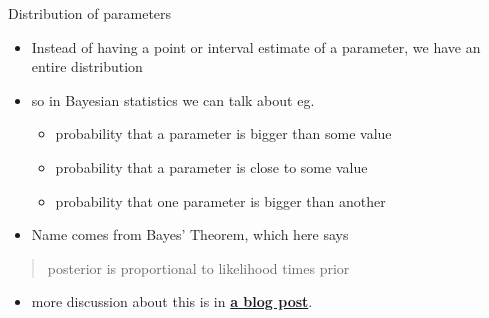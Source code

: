 \documentclass[
  ignorenonframetext,
]{beamer}
\providecommand{\tightlist}{%
  \setlength{\itemsep}{0pt}\setlength{\parskip}{0pt}}
\begin{document}
\begin{frame}{Distribution of parameters}
\protect\hypertarget{distribution-of-parameters}{}

\begin{itemize}
\tightlist
\item
  Instead of having a point or interval estimate of a parameter, we have
  an entire distribution
\item
  so in Bayesian statistics we can talk about eg.

  \begin{itemize}
  \tightlist
  \item
    probability that a parameter is bigger than some value
  \item
    probability that a parameter is close to some value
  \item
    probability that one parameter is bigger than another
  \end{itemize}
\item
  Name comes from Bayes' Theorem, which here says
\end{itemize}

\begin{quote}
posterior is proportional to likelihood times prior
\end{quote}

\begin{itemize}
\tightlist
\item
  more discussion about this is in
  \href{http://ritsokiguess.site/docs/2018/02/28/working-my-way-back-to-you-a-re-investigation-of-rstan/}{\textbf{a
  blog post}}.
\end{itemize}

\end{frame}
\end{document}
